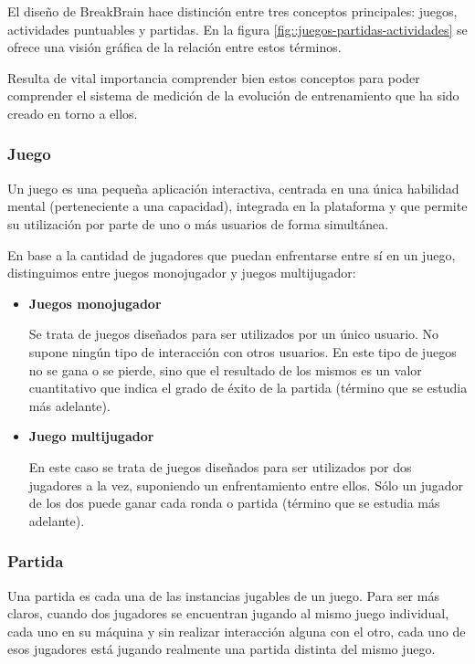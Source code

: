 El diseño de BreakBrain hace distinción entre tres conceptos principales: juegos, actividades puntuables y partidas. En la figura \ref{fig::juegos-partidas-actividades} se ofrece una visión gráfica de la relación entre estos términos.

Resulta de vital importancia comprender bien estos conceptos para poder comprender el sistema de medición de la evolución de entrenamiento que ha sido creado en torno a ellos.

\subsubsection{Juego}

Un juego es una pequeña aplicación interactiva, centrada en una única habilidad mental (perteneciente a una capacidad), integrada en la plataforma y que permite su utilización por parte de uno o más usuarios de forma simultánea.

En base a la cantidad de jugadores que puedan enfrentarse entre sí en un juego, distinguimos entre juegos monojugador y juegos multijugador:

\begin{itemize}
\item {\bf Juegos monojugador}

Se trata de juegos diseñados para ser utilizados por un único usuario. No supone ningún tipo de interacción con otros usuarios. En este tipo de juegos no se gana o se pierde, sino que el resultado de los mismos es un valor cuantitativo que indica el grado de éxito de la partida (término que se estudia más adelante).

\item {\bf Juego multijugador}

En este caso se trata de juegos diseñados para ser utilizados por dos jugadores a la vez, suponiendo un enfrentamiento entre ellos. Sólo un jugador de los dos puede ganar cada ronda o partida (término que se estudia más adelante).

\end{itemize}

\subsubsection{Partida}

Una partida es cada una de las instancias jugables de un juego. Para ser más claros, cuando dos jugadores se encuentran jugando al mismo juego individual, cada uno en su máquina y sin realizar interacción alguna con el otro, cada uno de esos jugadores está jugando realmente una partida distinta del mismo juego.

